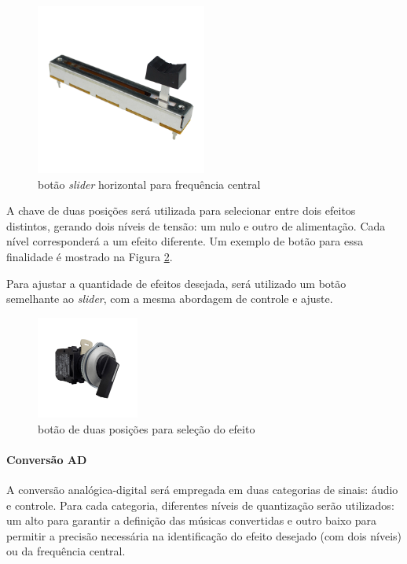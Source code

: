 \begin{figure}[h]
    \centering
    \includegraphics[width=0.5\textwidth]{figuras/fig61.png}
    \caption{botão \textit{slider} horizontal para frequência central \cite{robocore}}
    \label{fig61}
\end{figure}

A chave de duas posições será utilizada para selecionar entre dois efeitos distintos, gerando dois níveis de tensão: um nulo e outro de alimentação. Cada nível corresponderá a um efeito diferente. Um exemplo de botão para essa finalidade é mostrado na Figura \ref{fig62}.

Para ajustar a quantidade de efeitos desejada, será utilizado um botão semelhante ao \textit{slider}, com a mesma abordagem de controle e ajuste.

\begin{figure}[h]
    \centering
    \includegraphics[width=0.3\textwidth]{figuras/fig62.png}
    \caption{botão de duas posições para seleção do efeito \cite{evea}}
    \label{fig62}
\end{figure}


\paragraph{Conversão AD}

A conversão analógica-digital será empregada em duas categorias de sinais: áudio e controle. Para cada categoria, diferentes níveis de quantização serão utilizados: um alto para garantir a definição das músicas convertidas e outro baixo para permitir a precisão necessária na identificação do efeito desejado (com dois níveis) ou da frequência central.

